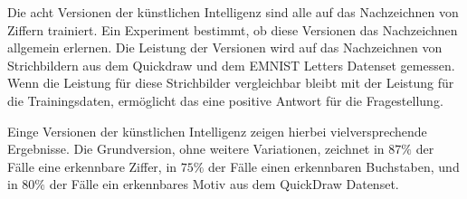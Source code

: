 Die acht Versionen der künstlichen Intelligenz sind alle auf das Nachzeichnen
von Ziffern trainiert. Ein Experiment bestimmt, ob diese Versionen das
Nachzeichnen allgemein erlernen. Die Leistung der Versionen wird auf das
Nachzeichnen von Strichbildern aus dem Quickdraw und dem EMNIST Letters Datenset
gemessen. Wenn die Leistung für diese Strichbilder vergleichbar bleibt mit der
Leistung für die Trainingsdaten, ermöglicht das eine positive Antwort für
die Fragestellung.

Einge Versionen der künstlichen Intelligenz zeigen hierbei vielversprechende
Ergebnisse. Die Grundversion, ohne weitere Variationen, zeichnet in $87\%$ der
Fälle eine erkennbare Ziffer, in $75\%$ der Fälle einen erkennbaren Buchstaben,
und in $80\%$ der Fälle ein erkennbares Motiv aus dem QuickDraw Datenset. 



